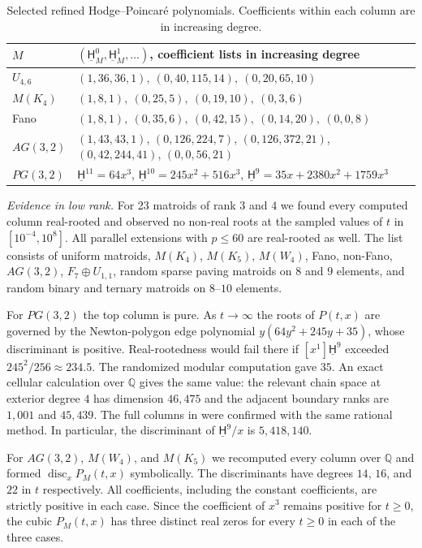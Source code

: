 \documentclass[a4paper,envcountsame,runningheads]{llncs}
\newcommand{\uH}{\underline{\mathsf H}}
\newcommand{\Q}{\mathbb Q}
\begin{document}
\begin{table}[t]
\caption{Selected refined Hodge--Poincar\'e polynomials. Coefficients within each column are in increasing degree.}
\label{tab:examples}
\centering\small
\begin{tabular}{@{}l>{\raggedright\arraybackslash}p{}@{}}\toprule
$M$ & $(\uH^0_M,\uH^1_M,\dots)$, coefficient lists in increasing degree\\ \midrule
$U_{4,6}$ & $(1,36,36,1),\ (0,40,115,14),\ (0,20,65,10)$\\
$M(K_4)$ & $(1,8,1),\ (0,25,5),\ (0,19,10),\ (0,3,6)$\\
Fano & $(1,8,1),\ (0,35,6),\ (0,42,15),\ (0,14,20),\ (0,0,8)$\\
$AG(3,2)$ & $(1,43,43,1)$, $(0,126,224,7)$, $(0,126,372,21)$,\newline
            $(0,42,244,41)$, $(0,0,56,21)$\\
$PG(3,2)$ & $\uH^{11}=64x^3$, $\uH^{10}=245x^2+516x^3$, $\uH^9=35x+2380x^2+1759x^3$\\ \bottomrule
\end{tabular}
\end{table}

\noindent\emph{Evidence in low rank.} For 23 matroids of rank $3$ and $4$ we found every computed column real-rooted and observed no non-real roots at the sampled values of $t$ in $[10^{-4},10^{8}]$. All parallel extensions with $p\le 60$ are real-rooted as well. The list consists of uniform matroids, $M(K_4)$, $M(K_5)$, $M(W_4)$, Fano, non-Fano, $AG(3,2)$, $F_7\oplus U_{1,1}$, random sparse paving matroids on $8$ and $9$ elements, and random binary and ternary matroids on $8$--$10$ elements.

For $PG(3,2)$ the top column is pure. As $t\to\infty$ the roots of $P(t,x)$ are governed by the Newton-polygon edge polynomial $y(64y^2+245y+35)$, whose discriminant is positive. Real-rootedness would fail there if $[x^1]\uH^{9}$ exceeded $245^2/256\approx234.5$. The randomized modular computation gave $35$. An exact cellular calculation over $\Q$ gives the same value: the relevant chain space at exterior degree $4$ has dimension $46{,}475$ and the adjacent boundary ranks are $1{,}001$ and $45{,}439$. The full columns in  were confirmed with the same rational method. In particular, the discriminant of $\uH^9/x$ is $5{,}418{,}140$.

For $AG(3,2)$, $M(W_4)$, and $M(K_5)$ we recomputed every column over $\Q$ and formed $\operatorname{disc}_x P_M(t,x)$ symbolically. The discriminants have degrees $14$, $16$, and $22$ in $t$ respectively. All coefficients, including the constant coefficients, are strictly positive in each case. Since the coefficient of $x^3$ remains positive for $t\ge0$, the cubic $P_M(t,x)$ has three distinct real zeros for every $t\ge0$ in each of the three cases.
\end{document}

